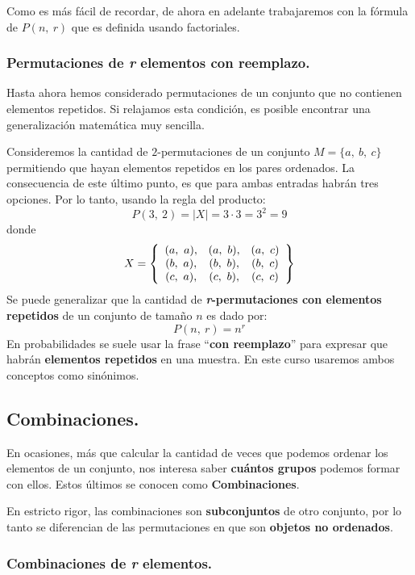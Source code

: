 \documentclass[12pt]{article}
\begin{document}
Como es más fácil de recordar, de ahora en adelante trabajaremos con la fórmula de $P(n, \ r)$ que es definida usando factoriales.

\subsubsection{Permutaciones de \textit{r} elementos con reemplazo.}

Hasta ahora hemos considerado permutaciones de un conjunto que no contienen elementos repetidos. Si relajamos esta condición, es posible encontrar una generalización matemática muy sencilla.

Consideremos la cantidad de $2$-permutaciones de un conjunto $M = \{a, \ b, \ c\}$ permitiendo que hayan elementos repetidos en los pares ordenados. La consecuencia de este último punto, es que para ambas entradas habrán tres opciones. Por lo tanto, usando la regla del producto:
\[
  P(3, \ 2) = |X| = 3 \cdot 3 = 3^{2} = 9
\]
donde
\[
X = \left\{
\begin{array}{c c c}
(a, \ a), & (a, \ b), & (a, \ c) \\
(b, \ a), & (b, \ b), & (b, \ c) \\
(c, \ a), & (c, \ b), & (c, \ c) \\
\end{array}
\right\}
\]
Se puede generalizar que la cantidad de \textbf{\textit{r}-permutaciones con elementos repetidos} de un conjunto de tamaño $n$ es dado por:
\[
  P(n, \ r) = n^{r}
\]
En probabilidades se suele usar la frase ``\textbf{con reemplazo}'' para expresar que habrán \textbf{elementos repetidos} en una muestra. En este curso usaremos ambos conceptos como sinónimos.

\subsection{Combinaciones.}

En ocasiones, más que calcular la cantidad de veces que podemos ordenar los elementos de un conjunto, nos interesa saber \textbf{cuántos grupos} podemos formar con ellos. Estos últimos se conocen como \textbf{Combinaciones}.

En estricto rigor, las combinaciones son \textbf{subconjuntos} de otro conjunto, por lo tanto se diferencian de las permutaciones en que son \textbf{objetos no ordenados}.

\subsubsection{Combinaciones de \textit{r} elementos.}
\end{document}
